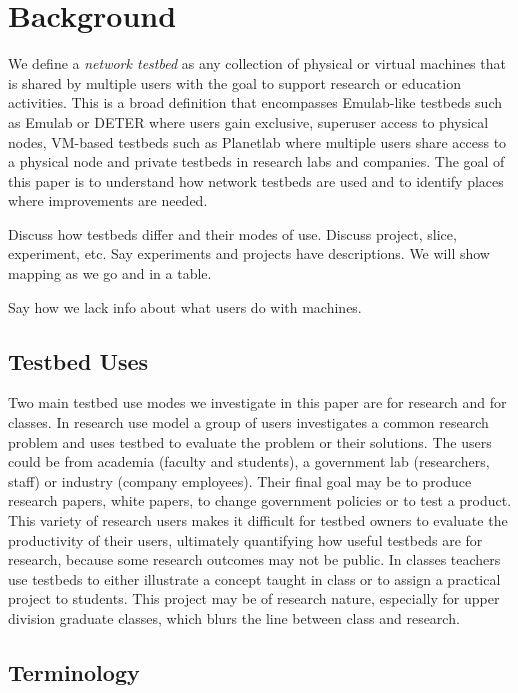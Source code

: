 \section{Background}
\label{sec:terms}

We define a \textit{network testbed} as any collection of physical or
virtual machines that is shared by multiple users with the goal to
support research or education activities. This is a broad definition
that encompasses Emulab-like testbeds such as Emulab \cite{emulab} or
DETER \cite{deterlab} where users gain exclusive, superuser access to
physical nodes, VM-based testbeds such as Planetlab \cite{planetlab}
where multiple users share access to a physical node and private
testbeds in research labs and companies. The goal of this paper is to
understand how network testbeds are used and to identify places where
improvements are needed.

Discuss how testbeds differ and their modes of use. Discuss project,
slice, experiment, etc. Say experiments and projects have descriptions.
We will show mapping as we go and in a table.

Say how we lack info about what users do with machines.

\subsection{Testbed Uses}

Two main testbed use modes we investigate in this paper are for research
and for classes. In research use model a group of users investigates a
common research problem and uses testbed to evaluate the problem or
their solutions. The users could be from academia (faculty and
students), a government lab (researchers, staff)  or industry (company
employees). Their final goal may be to produce research papers, white
papers, to change government policies or to test a product. This variety
of research users makes it difficult for testbed owners to evaluate the
productivity of their users, ultimately quantifying how useful testbeds
are for research, because some research outcomes may not be public. In
classes teachers use testbeds to either illustrate a concept taught in
class or to assign a practical project to students. This project may be
of research nature, especially for upper division graduate classes,
which blurs the line between class and research.

\subsection{Terminology} \label{terminology}

